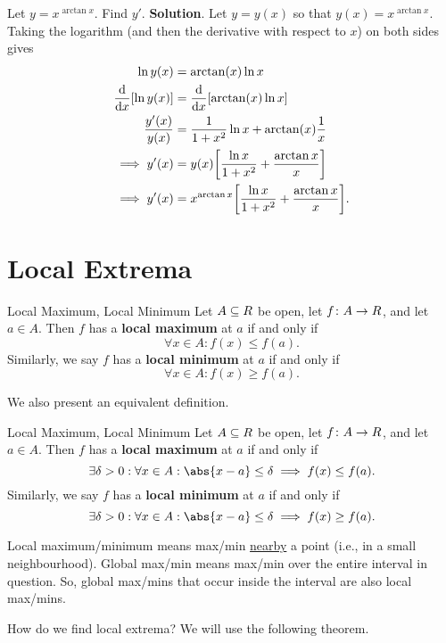 \begin{Example}{}{}
    Let $ y=x^{\arctan x} $. Find $ y' $.
    \tcblower{}
    \textbf{Solution}. Let $ y=y(x) $ so that $ y(x)=x^{\arctan x} $.
    Taking the logarithm (and then the derivative with respect to $ x $) on both sides gives
    \begin{align*}
        \ln y(x)             & =\arctan(x)\ln x                                                     \\
        \odv*{[\ln y(x)]}{x} & =\odv*{[\arctan(x)\ln x]}{x}                                         \\
        \frac{y'(x)}{y(x)}   & =\frac{1}{1+x^2}\ln x+\arctan(x) \frac{1}{x}                         \\
        \implies y'(x)       & =y(x)\biggl[\frac{\ln x}{1+x^2}+\frac{\arctan x}{x}\biggr]           \\
        \implies y'(x)       & =x^{\arctan x}\biggl[\frac{\ln x}{1+x^2}+\frac{\arctan x}{x}\biggr]. \\
    \end{align*}
\end{Example}
\section{Local Extrema}
\begin{Definition}{Local Maximum, Local Minimum}{}
    Let $ A\subseteq\relax{R} $ be open, let $ f\colon A\to\relax{R} $, and let $ a\in A $. Then $ f $
    has a \textbf{local maximum} at $ a $ if and only if
    \[ \forall x\in A: f(x)\le f(a). \]
    Similarly, we say $ f $ has a \textbf{local minimum} at $ a $ if and only if
    \[ \forall x\in A: f(x)\ge f(a). \]
\end{Definition}
We also present an equivalent definition.
\begin{Definition}{Local Maximum, Local Minimum}{}
    Let $ A\subseteq\relax{R} $ be open, let $ f\colon A\to\relax{R} $, and let $ a\in A $. Then $ f $
    has a \textbf{local maximum} at $ a $ if and only if
    \[ \exists \delta>0:\forall x\in A: \abs{x-a}\le \delta\implies f(x)\le f(a). \]
    Similarly, we say $ f $ has a \textbf{local minimum} at $ a $ if and only if
    \[ \exists \delta>0:\forall x\in A: \abs{x-a}\le \delta\implies f(x)\ge f(a). \]
\end{Definition}
\begin{Remark}{}{}
    Local maximum/minimum means max/min \underline{nearby} a point (i.e., in a small neighbourhood).
    Global max/min means max/min over the entire interval in question. So, global max/mins that occur inside the interval
    are also local max/mins.
\end{Remark}
How do we find local extrema? We will use the following theorem.

